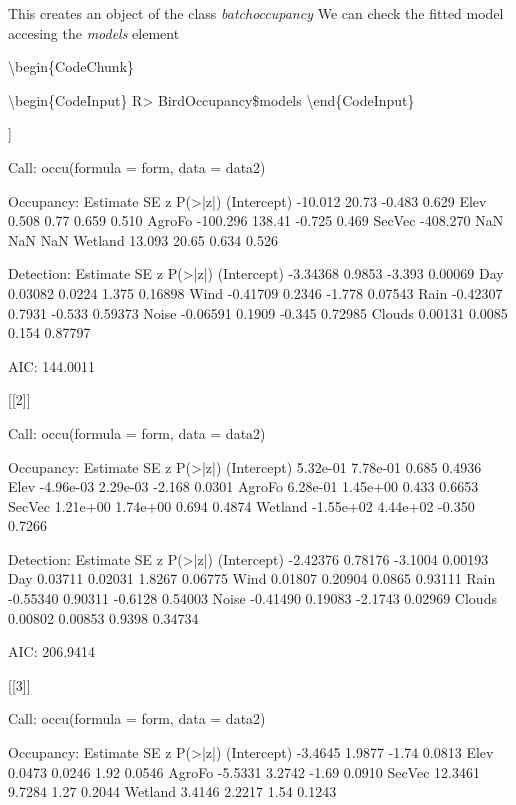 \documentclass[article]{jss}
\begin{document}
This creates an object of the class \emph{batchoccupancy} We can check
the fitted model accesing the \emph{models} element

\textbackslash{}begin\{CodeChunk\}

\textbackslash{}begin\{CodeInput\} R\textgreater{} BirdOccupancy\$models
\textbackslash{}end\{CodeInput\}

\begin{CodeOutput}
[[1]]

Call:
occu(formula = form, data = data2)

Occupancy:
            Estimate     SE      z P(>|z|)
(Intercept)  -10.012  20.73 -0.483   0.629
Elev           0.508   0.77  0.659   0.510
AgroFo      -100.296 138.41 -0.725   0.469
SecVec      -408.270    NaN    NaN     NaN
Wetland       13.093  20.65  0.634   0.526

Detection:
            Estimate     SE      z P(>|z|)
(Intercept) -3.34368 0.9853 -3.393 0.00069
Day          0.03082 0.0224  1.375 0.16898
Wind        -0.41709 0.2346 -1.778 0.07543
Rain        -0.42307 0.7931 -0.533 0.59373
Noise       -0.06591 0.1909 -0.345 0.72985
Clouds       0.00131 0.0085  0.154 0.87797

AIC: 144.0011 

[[2]]

Call:
occu(formula = form, data = data2)

Occupancy:
             Estimate       SE      z P(>|z|)
(Intercept)  5.32e-01 7.78e-01  0.685  0.4936
Elev        -4.96e-03 2.29e-03 -2.168  0.0301
AgroFo       6.28e-01 1.45e+00  0.433  0.6653
SecVec       1.21e+00 1.74e+00  0.694  0.4874
Wetland     -1.55e+02 4.44e+02 -0.350  0.7266

Detection:
            Estimate      SE       z P(>|z|)
(Intercept) -2.42376 0.78176 -3.1004 0.00193
Day          0.03711 0.02031  1.8267 0.06775
Wind         0.01807 0.20904  0.0865 0.93111
Rain        -0.55340 0.90311 -0.6128 0.54003
Noise       -0.41490 0.19083 -2.1743 0.02969
Clouds       0.00802 0.00853  0.9398 0.34734

AIC: 206.9414 

[[3]]

Call:
occu(formula = form, data = data2)

Occupancy:
            Estimate     SE     z P(>|z|)
(Intercept)  -3.4645 1.9877 -1.74  0.0813
Elev          0.0473 0.0246  1.92  0.0546
AgroFo       -5.5331 3.2742 -1.69  0.0910
SecVec       12.3461 9.7284  1.27  0.2044
Wetland       3.4146 2.2217  1.54  0.1243


\end{CodeOutput}
\end{document}
